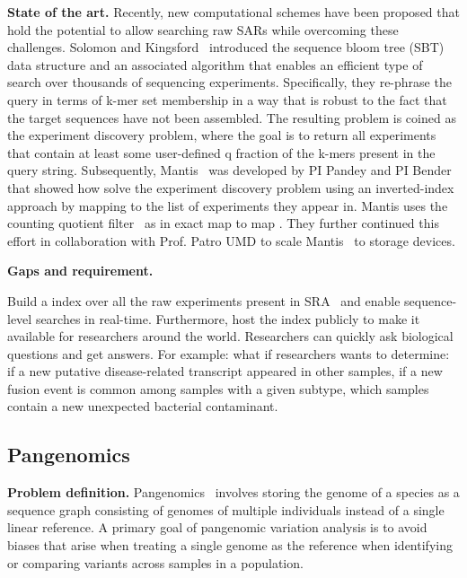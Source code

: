 \noindent
{\bf State of the art.}
Recently, new computational schemes have been proposed
that hold the potential to allow searching raw SARs while overcoming these challenges. Solomon and Kingsford~\cite{solomon2016fast} introduced the sequence bloom tree (SBT) data structure and an associated algorithm that enables an efficient type of search over thousands of sequencing experiments. Specifically, they re-phrase the query in terms of k-mer set membership in a way that is robust to the fact that the target sequences have not been assembled. The resulting problem is coined as the experiment discovery problem, where the goal is to return all experiments that contain at least some user-defined q fraction of the k-mers present in the query string.
%
Subsequently, Mantis~\cite{PandeyABFJP18Cell} was developed by PI Pandey and PI Bender that showed how solve the experiment discovery problem using an inverted-index approach by mapping \kmers to the list of experiments they appear in. Mantis uses the counting quotient filter~\cite{PandeyBJP17} as in exact map to map \kmers. They further continued this effort in collaboration with Prof. Patro UMD to scale Mantis~\cite{AlmodaresiPFJP19,AlmodaresiPFJP20} to storage devices.


\noindent
{\bf Gaps and requirement.}


\begin{rproblem}
Build a \kmer index over all the raw experiments present in SRA~\cite{kodama2012sequence} and enable sequence-level searches in real-time. Furthermore, host the index publicly to make it available for researchers around the world. Researchers can quickly ask biological questions and get answers. For example: what if researchers wants to determine: if a new putative disease-related transcript appeared in other samples, if a new fusion event is
common among samples with a given subtype, which samples contain a new unexpected bacterial contaminant. 
\label{rprob:peppermint2}
\end{rproblem}

\subsection{Pangenomics}

{\bf Problem definition.}
Pangenomics~\cite{garrison2018variation} involves storing the genome of a species as a sequence graph consisting of genomes of multiple individuals instead of a single linear reference. A primary goal of pangenomic variation analysis is to avoid biases that arise when treating a single genome as the reference when identifying or comparing variants across samples in a population.

